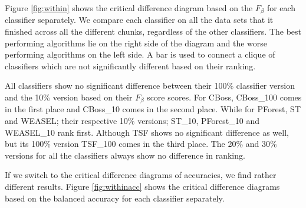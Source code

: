 Figure \ref{fig:within} shows the critical difference diagram based on the $F_{\beta}$ for each classifier separately.
We compare each classifier on all the data sets that it finished across all the different chunks, regardless of the other classifiers.
The best performing algorithms lie on the right side of the diagram and the worse performing algorithms on the left side.
A bar is used to connect a clique of classifiers which are not significantly different based on their ranking. 

All classifiers show no significant difference between their 100\% classifier version and the 10\% version based on their $F_{\beta}$ score scores.
For CBoss, CBoss\_100 comes in the first place and CBoss\_10 comes in the second place. While for PForest, ST and WEASEL;
their respective 10\% versions; ST\_10, PForest\_10 and WEASEL\_10 rank first.
Although TSF shows no significant difference as well, but its 100\% version TSF\_100 comes in the third place.
The 20\% and 30\% versions for all the classifiers always show no difference in ranking.

If we switch to the critical difference diagrams of accuracies, we find rather different results.
Figure \ref{fig:withinacc} shows the critical difference diagrams based on the balanced accuracy for each classifier separately.

